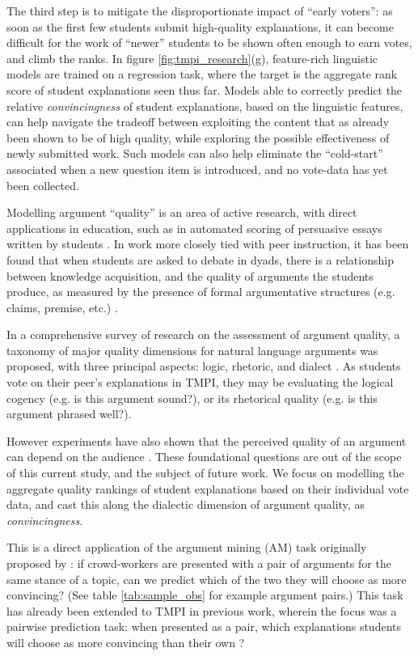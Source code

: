 \documentclass[notitlepage,12pt]{jedm}
\begin{document}
The third step is to mitigate the disproportionate impact of ``early voters'': 
as soon as the first few students submit high-quality explanations, it can 
become difficult for the work of ``newer'' students to be shown often enough to 
earn votes, and climb the ranks.
In figure \ref{fig:tmpi_research}(g), feature-rich linguistic models are 
trained on a regression task, where the target is the aggregate rank score of 
student explanations seen thus far. 
Models able to correctly predict the relative \textit{convincingness} of 
student explanations, based on the linguistic features, can help navigate the 
tradeoff between exploiting the content that as already been shown to be of 
high quality, while exploring the possible effectiveness of newly submitted 
work.
Such models can also help eliminate the ``cold-start'' associated when a new 
question item is introduced, and no vote-data has yet been collected.

Modelling argument ``quality'' is an area of active research, with direct 
applications in education, such as in automated scoring of 
persuasive essays written by students 
\cite{persing_modeling_2015,nguyen_argument_2018}.
In work more closely tied with peer instruction, it has been found that when 
students are asked to debate in dyads, there is a relationship between  
knowledge acquisition, and the quality of arguments the students produce, as 
measured by the presence of formal argumentative structures (e.g. claims, 
premise, etc.) \cite{garcia-mila_effect_2013}.

In a comprehensive survey of research on the assessment of argument quality, a 
taxonomy of major quality dimensions for natural language arguments was 
proposed, with three principal aspects: logic, rhetoric, and dialect 
\cite{wachsmuth_computational_2017}. 
As students vote on their peer's explanations in TMPI, they may be evaluating 
the logical cogency (e.g. is this argument sound?), or its rhetorical quality 
(e.g. is this argument phrased well?). 

However experiments have also shown that the perceived quality of an argument 
can depend on the audience \cite{mercier_why_2011}. 
These foundational questions are out of the scope of this current study, and 
the subject of future work. 
We focus on modelling the aggregate quality rankings of student explanations 
based on their individual vote data, and cast this along the dialectic 
dimension of argument quality, as \textit{convincingness}.

This is a direct application of the argument mining (AM) task originally 
proposed by \cite{habernal_which_2016}: if crowd-workers are presented with a 
pair of arguments for the same stance of a topic, can we predict 
which of the two they will choose as more convincing? 
(See table \ref{tab:sample_obs} for example argument pairs.)
This task has already been extended to TMPI in previous work, wherein the focus 
was a pairwise prediction task: when presented as a pair, which explanations 
students will choose as more convincing than their own 
\cite{bhatnagar_learnersourcing_2020}?
\end{document}
